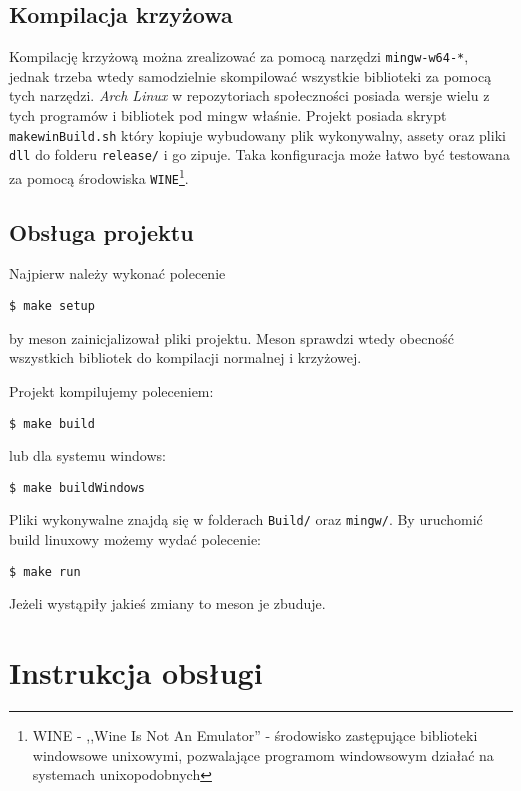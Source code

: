 \documentclass[a4paper,11pt]{article}
\begin{document}
\subsection*{Kompilacja krzyżowa}

Kompilację krzyżową można zrealizować za pomocą narzędzi \texttt{mingw-w64-*}, jednak trzeba wtedy samodzielnie skompilować wszystkie biblioteki za pomocą tych narzędzi. \emph{Arch Linux} w repozytoriach społeczności posiada wersje wielu z tych programów i bibliotek pod mingw właśnie. Projekt posiada skrypt \texttt{makewinBuild.sh} który kopiuje wybudowany plik wykonywalny, assety oraz pliki \texttt{dll} do folderu \texttt{release/} i go zipuje. Taka konfiguracja może łatwo być testowana za pomocą środowiska \texttt{WINE}\footnote{WINE - ,,Wine Is Not An Emulator'' - środowisko zastępujące biblioteki windowsowe unixowymi, pozwalające programom windowsowym działać na systemach unixopodobnych}.

\subsection*{Obsługa projektu}

Najpierw należy wykonać polecenie
\begin{lstlisting}[frame=single,basicstyle=\ttfamily]
$ make setup
\end{lstlisting}
by meson zainicjalizował pliki projektu. Meson sprawdzi wtedy obecność wszystkich bibliotek do kompilacji normalnej i krzyżowej.

Projekt kompilujemy poleceniem:
\begin{lstlisting}[frame=single,basicstyle=\ttfamily]
$ make build
\end{lstlisting}
lub dla systemu windows:
\begin{lstlisting}[frame=single,basicstyle=\ttfamily]
$ make buildWindows
\end{lstlisting}

Pliki wykonywalne znajdą się w folderach \texttt{Build/} oraz \texttt{mingw/}. By uruchomić build linuxowy możemy wydać polecenie:
\begin{lstlisting}[frame=single,basicstyle=\ttfamily]
$ make run
\end{lstlisting}

Jeżeli wystąpiły jakieś zmiany to meson je zbuduje.


\section{Instrukcja obsługi}
\end{document}

